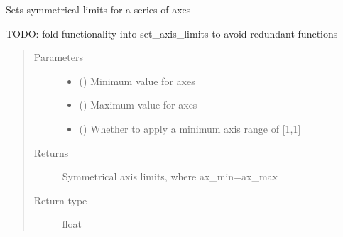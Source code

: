 \documentclass[letterpaper,10pt,english]{sphinxmanual}
\begin{document}
\begin{fulllineitems}
\label{\detokenize{_autosummary/tools.plotting.set_symmetrical_axis_limits:tools.plotting.set_symmetrical_axis_limits}}
\sphinxAtStartPar
Sets symmetrical limits for a series of axes

\sphinxAtStartPar
TODO: fold functionality into set\_axis\_limits to avoid redundant functions
\begin{quote}\begin{description}
\item[{Parameters}] \leavevmode\begin{itemize}
\item {} 
\sphinxAtStartPar
{} () \textendash{} Minimum value for axes

\item {} 
\sphinxAtStartPar
{} () \textendash{} Maximum value for axes

\item {} 
\sphinxAtStartPar
{} (\sphinxstyleliteralemphasis{\sphinxupquote{, }}) \textendash{} Whether to apply a minimum axis range of {[}\sphinxhyphen{}1,1{]}

\end{itemize}

\item[{Returns}] \leavevmode
\sphinxAtStartPar
{} \textendash{} Symmetrical axis limits, where ax\_min=\sphinxhyphen{}ax\_max

\item[{Return type}] \leavevmode
\sphinxAtStartPar
float

\end{description}\end{quote}

\end{fulllineitems}
\end{document}
